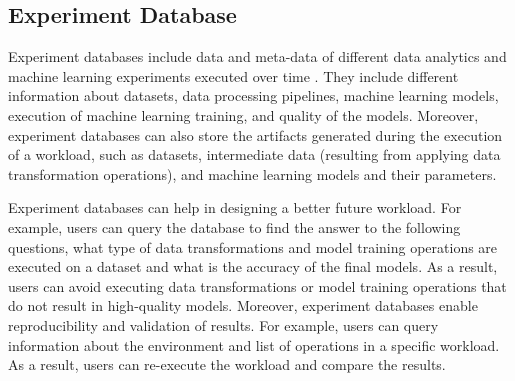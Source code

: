 \subsection{Experiment Database}
Experiment databases include data and meta-data of different data analytics and machine learning experiments executed over time \cite{miao2018provdb, vanschoren2014openml, schelter2017automatically, vartak2016m}.
They include different information about datasets, data processing pipelines, machine learning models, execution of machine learning training, and quality of the models. 
Moreover, experiment databases can also store the artifacts generated during the execution of a workload, such as datasets, intermediate data (resulting from applying data transformation operations), and machine learning models and their parameters.
 
Experiment databases can help in designing a better future workload.
For example, users can query the database to find the answer to the following questions, what type of data transformations and model training operations are executed on a dataset and what is the accuracy of the final models.
As a result, users can avoid executing data transformations or model training operations that do not result in high-quality models.
Moreover, experiment databases enable reproducibility and validation of results.
For example, users can query information about the environment and list of operations in a specific workload.
As a result, users can re-execute the workload and compare the results.